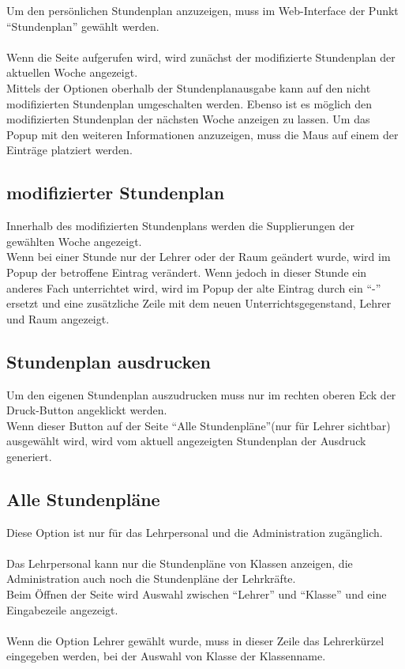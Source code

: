 Um den persönlichen Stundenplan anzuzeigen, muss im Web-Interface der Punkt \enquote{Stundenplan} gewählt werden. \\
\\
Wenn die Seite aufgerufen wird, wird zunächst der modifizierte Stundenplan der aktuellen Woche angezeigt.\\
Mittels der Optionen oberhalb der Stundenplanausgabe kann auf den nicht modifizierten Stundenplan umgeschalten werden. Ebenso ist es möglich den modifizierten Stundenplan der nächsten Woche anzeigen zu lassen.
Um das Popup mit den weiteren Informationen anzuzeigen, muss die Maus auf einem der Einträge platziert werden.
\subsection{modifizierter Stundenplan}
Innerhalb des modifizierten Stundenplans werden die Supplierungen der gewählten Woche angezeigt.\\
Wenn bei einer Stunde nur der Lehrer oder der Raum geändert wurde, wird im Popup der betroffene Eintrag verändert. Wenn jedoch in dieser Stunde ein anderes Fach unterrichtet wird, wird im Popup der alte Eintrag durch ein \enquote{-} ersetzt und eine zusätzliche Zeile mit dem neuen Unterrichtsgegenstand, Lehrer und Raum angezeigt.
\subsection{Stundenplan ausdrucken}
Um den eigenen Stundenplan auszudrucken muss nur im rechten oberen Eck der Druck-Button angeklickt werden.\\
Wenn dieser Button auf der Seite \enquote{Alle Stundenpläne}(nur für Lehrer sichtbar) ausgewählt wird, wird vom aktuell angezeigten Stundenplan der Ausdruck generiert.
\subsection{Alle Stundenpläne}
Diese Option ist nur für das Lehrpersonal und die Administration zugänglich.\\\\
Das Lehrpersonal kann nur die Stundenpläne von Klassen anzeigen, die Administration auch noch die Stundenpläne der Lehrkräfte.\\
Beim Öffnen der Seite wird Auswahl zwischen \enquote{Lehrer} und \enquote{Klasse} und eine Eingabezeile angezeigt.\\
\\
Wenn die Option Lehrer gewählt wurde, muss in dieser Zeile das Lehrerkürzel eingegeben werden, bei der Auswahl von Klasse der Klassenname.

